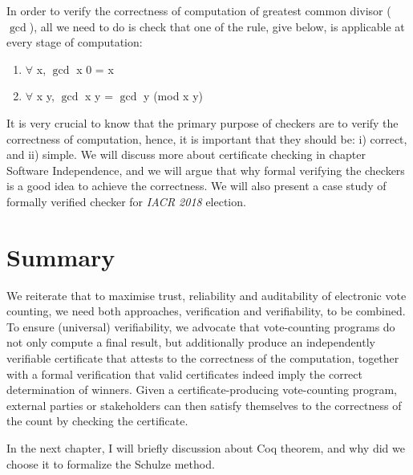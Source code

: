    
   In order to verify the correctness of computation of greatest common divisor ($\gcd$), all we need to do is 
   check  that one of the rule, give below, is applicable at every stage of computation:
   \begin{enumerate}
   \item  $\forall$ x, $\gcd$ x 0 = x
   \item $\forall$ x y, $\gcd$ x y = $\gcd$ y (mod x y)
   \end{enumerate}
   
   \noindent 
  It is very crucial to know that the primary purpose of checkers are to verify the 
  correctness of computation, hence, it is important that they 
  should be: i) correct, and ii) simple.  We will discuss more about certificate checking 
  in chapter Software Independence,  and we will argue that why formal verifying the checkers is 
  a good idea to achieve the correctness.  We will also present a case study of 
  formally verified checker for \textit{IACR 2018} election.
  
  
    
   
\section{Summary}
We reiterate that to maximise trust, reliability and auditability of electronic vote counting, we
need both approaches, verification and verifiability, to be combined. To ensure
(universal) verifiability, we advocate that vote-counting programs
do not only compute a final result, but additionally produce an
independently verifiable certificate that attests to the correctness
of the computation, together with a formal verification that
valid certificates indeed imply the correct determination of
winners. Given a certificate-producing vote-counting program, external
parties or stakeholders can then satisfy themselves to the
correctness of the count by checking the certificate.    

In the next chapter, I will  briefly discussion about Coq theorem, and why did we choose it 
to formalize the Schulze method.